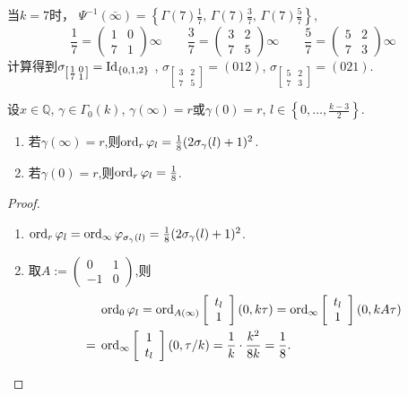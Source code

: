 \begin{example1}
	当$k=7$时， $\displaystyle\Psi^{-1}(\bar{\infty})=\left\{\Gamma(7)\frac{1}{7},\,\Gamma(7)\frac{3}{7},\,\Gamma(7)\frac{5}{7} \right \}$,
	$$\frac{1}{7}= \begin{pmatrix}
	1 & 0 \\ 7 & 1
	\end{pmatrix}\infty \qquad \frac{3}{7}= \begin{pmatrix}
	3 & 2 \\ 7 & 5
	\end{pmatrix}\infty \qquad \frac{5}{7}= \begin{pmatrix}
	5 & 2 \\ 7 & 3
	\end{pmatrix}\infty$$
	计算得到$\sigma_{\left[\begin{smallmatrix}
		1 & 0 \\ 7 & 1
		\end{smallmatrix}\right]} =\operatorname{\operatorname{Id}}_{\{0,1,2\}}$ , $\sigma_{\left[\begin{smallmatrix}
		3 & 2 \\ 7 & 5
		\end{smallmatrix}\right]} =(012)$, $\sigma_{\left[\begin{smallmatrix}
		5 & 2 \\ 7 & 3
		\end{smallmatrix}\right]} =(021)$.
\end{example1}

\begin{theorem}
	设$x \in \mathbb{Q}$, $\gamma \in \Gamma_0(k)$, $\gamma (\infty)=r$或$\gamma(0)=r$, $l \in \left\{ 0,\ldots,\frac{k-3}{2} \right\}$.
	\begin{enumerate}[(1)]
		\item 若$\gamma(\infty)=r$,则$\operatorname{ord}_r \varphi_l=\frac{1}{8}(2\sigma_{\gamma}(l)+1)^2$.
		\item 若$\gamma(0)=r$,则$\operatorname{ord}_r \varphi_l=\frac{1}{8}$.
	\end{enumerate}
\end{theorem}
\begin{proof}\
	\begin{enumerate}[(1)]
		\item $\operatorname{ord}_r \varphi_l=\operatorname{ord}_{\infty} \varphi_{\sigma_{\gamma}(l)}=\frac{1}{8}(2\sigma_{\gamma}(l)+1)^2$.
		\item 取$A:= \left(\begin{smallmatrix}
		0 & 1 \\ -1 & 0
		\end{smallmatrix} \right)$,则
		\begin{equation*}
		\begin{aligned}
		&\operatorname{ord}_0 \varphi_l=\operatorname{ord}_{A(\infty)} \left[\begin{array}{c}{t_l} \\ {1}\end{array}\right](0,k\tau)=\operatorname{ord}_{\infty} \left[\begin{array}{c}{t_l} \\ {1}\end{array}\right](0,kA\tau)\\
		=\;&\operatorname{ord}_{\infty} \left[\begin{array}{c}{1} \\ {t_l}\end{array}\right](0,\tau/k)=\frac{1}{k} \cdot \frac{k^2}{8k}= \frac{1}{8}.
		\end{aligned}
		\end{equation*}
	\end{enumerate}
\end{proof}

